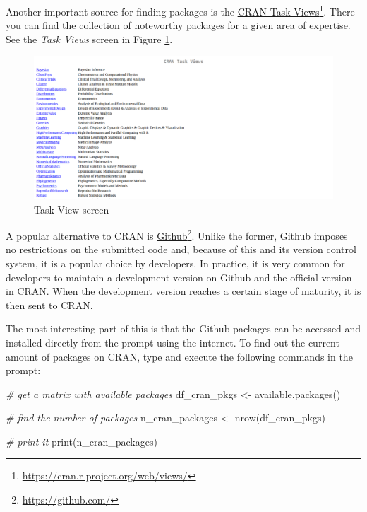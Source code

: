 \documentclass[
  12pt,
]{book}
\newenvironment{Shaded}{\begin{snugshade}}{\end{snugshade}}
\newcommand{\CommentTok}[1]{\textcolor[rgb]{0.37,0.37,0.37}{\textit{#1}}}
\newcommand{\FunctionTok}[1]{\textcolor[rgb]{0,0,0}{#1}}
\newcommand{\NormalTok}[1]{#1}
\newcommand{\OtherTok}[1]{\textcolor[rgb]{0.37,0.37,0.37}{#1}}
\begin{document}
Another important source for finding packages is the \href{https://cran.r-project.org/web/views/}{CRAN Task Views}\footnote{\url{https://cran.r-project.org/web/views/}}. There you can find the collection of noteworthy packages for a given area of expertise. See the \emph{Task Views} screen in Figure \ref{fig:TaskViews}.

\begin{figure}[!htbp]

{\centering \includegraphics[width=1\linewidth]{figs/TaskViews} 

}

\caption{Task View screen}\label{fig:TaskViews}
\end{figure}

A popular alternative to CRAN is \href{https://github.com/}{Github}\footnote{\url{https://github.com/}}. Unlike the former, Github imposes no restrictions on the submitted code and, because of this and its version control system, it is a popular choice by developers. In practice, it is very common for developers to maintain a development version on Github and the official version in CRAN. When the development version reaches a certain stage of maturity, it is then sent to CRAN.

The most interesting part of this is that the Github packages can be accessed and installed directly from the prompt using the internet. To find out the current amount of packages on CRAN, type and execute the following commands in the prompt:

\begin{Shaded}
\begin{Highlighting}[]
\CommentTok{\# get a matrix with available packages}
\NormalTok{df\_cran\_pkgs }\OtherTok{\textless{}{-}} \FunctionTok{available.packages}\NormalTok{()}

\CommentTok{\# find the number of packages}
\NormalTok{n\_cran\_packages }\OtherTok{\textless{}{-}} \FunctionTok{nrow}\NormalTok{(df\_cran\_pkgs)}

\CommentTok{\# print it}
\FunctionTok{print}\NormalTok{(n\_cran\_packages)}
\end{Highlighting}
\end{Shaded}
\end{document}
